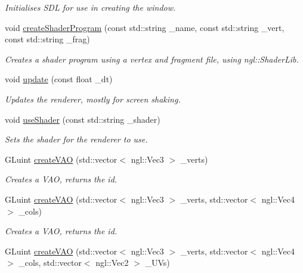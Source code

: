 \begin{DoxyCompactItemize}
\begin{DoxyCompactList}\small\item\em Initialises S\-D\-L for use in creating the window. \end{DoxyCompactList}\item 
void \hyperlink{classrenderer__ngl_a369ca2d986609210b25930c214e83cd9}{create\-Shader\-Program} (const std\-::string \-\_\-name, const std\-::string \-\_\-vert, const std\-::string \-\_\-frag)
\begin{DoxyCompactList}\small\item\em Creates a shader program using a vertex and fragment file, using ngl\-::\-Shader\-Lib. \end{DoxyCompactList}\item 
void \hyperlink{classrenderer__ngl_acd7d251987286559146ed9b53cf92f88}{update} (const float \-\_\-dt)
\begin{DoxyCompactList}\small\item\em Updates the renderer, mostly for screen shaking. \end{DoxyCompactList}\item 
void \hyperlink{classrenderer__ngl_a1cd4a1d0f26f09d11220825a79f93423}{use\-Shader} (const std\-::string \-\_\-shader)
\begin{DoxyCompactList}\small\item\em Sets the shader for the renderer to use. \end{DoxyCompactList}\item 
G\-Luint \hyperlink{classrenderer__ngl_a99b9e6141013b96e0e3e5ab9c43767f1}{create\-V\-A\-O} (std\-::vector$<$ ngl\-::\-Vec3 $>$ \-\_\-verts)
\begin{DoxyCompactList}\small\item\em Creates a V\-A\-O, returns the id. \end{DoxyCompactList}\item 
G\-Luint \hyperlink{classrenderer__ngl_a076cc765b2833b046887f092c2472257}{create\-V\-A\-O} (std\-::vector$<$ ngl\-::\-Vec3 $>$ \-\_\-verts, std\-::vector$<$ ngl\-::\-Vec4 $>$ \-\_\-cols)
\begin{DoxyCompactList}\small\item\em Creates a V\-A\-O, returns the id. \end{DoxyCompactList}\item 
G\-Luint \hyperlink{classrenderer__ngl_a3686dedd948e19cd997321f2a31af185}{create\-V\-A\-O} (std\-::vector$<$ ngl\-::\-Vec3 $>$ \-\_\-verts, std\-::vector$<$ ngl\-::\-Vec4 $>$ \-\_\-cols, std\-::vector$<$ ngl\-::\-Vec2 $>$ \-\_\-\-U\-Vs)

\end{DoxyCompactItemize}
